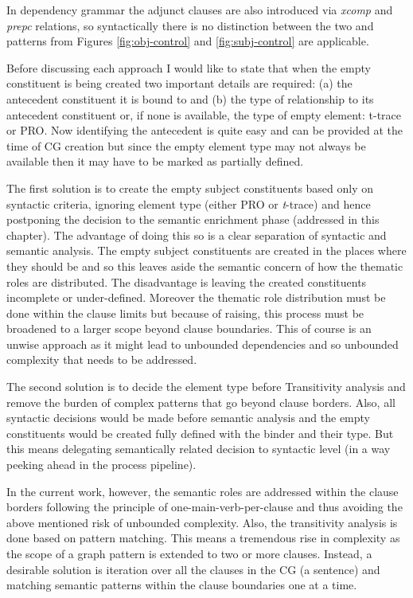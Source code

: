    In dependency grammar the adjunct clauses are also introduced via \textit{xcomp} and \textit{prepc} relations, so syntactically there is no distinction between the two and patterns from Figures \ref{fig:obj-control} and \ref{fig:subj-control} are applicable.


    Before discussing each approach I would like to state that when the empty constituent is being created two important details are required: (a) the antecedent constituent it is bound to and (b) the type of relationship to its antecedent constituent or, if none is available, the type of empty element: t-trace or PRO. Now identifying the antecedent is quite easy and can be provided at the time of CG creation but since the empty element type may not always be available then it may have to be marked as partially defined.

    The first solution is to create the empty subject constituents based only on syntactic criteria, ignoring element type (either PRO or \textit{t}-trace) and hence postponing the decision to the semantic enrichment phase (addressed in this chapter). The advantage of doing this so is a clear separation of syntactic and semantic analysis. The empty subject constituents are created in the places where they should be and so this leaves aside the semantic concern of how the thematic roles are distributed. The disadvantage is leaving the created constituents incomplete or under-defined. Moreover the thematic role distribution must be done within the clause limits but because of raising, this process must be broadened to a larger scope beyond clause boundaries. This of course is an unwise approach as it might lead to unbounded dependencies and so unbounded complexity that needs to be addressed. 

    The second solution is to decide the element type before Transitivity analysis and remove the burden of complex patterns that go beyond clause borders. Also, all syntactic decisions would be made before semantic analysis and the empty constituents would be created fully defined with the binder and their type. But this means delegating semantically related decision to syntactic level (in a way peeking ahead in the process pipeline).

    In the current work, however, the semantic roles are addressed within the clause borders following the principle of one-main-verb-per-clause and thus avoiding the above mentioned risk of unbounded complexity. Also, the transitivity analysis is done based on pattern matching. This means a tremendous rise in complexity as the scope of a graph pattern is extended to two or more clauses. Instead, a desirable solution is iteration over all the clauses in the CG (a sentence) and matching semantic patterns within the clause boundaries one at a time.

